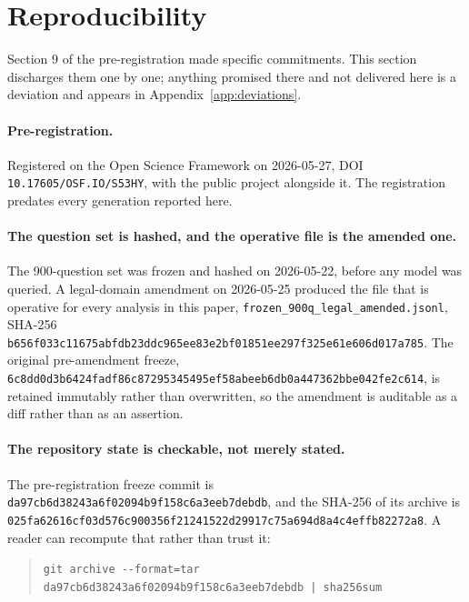 
\section{Reproducibility}

Section 9 of the pre-registration made specific commitments. This section
discharges them one by one; anything promised there and not delivered here is a
deviation and appears in Appendix~\ref{app:deviations}.

\paragraph{Pre-registration.}
Registered on the Open Science Framework on 2026-05-27, DOI
\texttt{10.17605/OSF.IO/S53HY}, with the public project alongside it. The
registration predates every generation reported here.

\paragraph{The question set is hashed, and the operative file is the amended one.}
The 900-question set was frozen and hashed on 2026-05-22, before any model was
queried. A legal-domain amendment on 2026-05-25 produced the file that is
operative for every analysis in this paper,
\texttt{frozen\_900q\_legal\_amended.jsonl}, SHA-256
\texttt{b656f033c11675abfdb23ddc965ee83e2bf01851ee297f325e61e606d017a785}. The
original pre-amendment freeze,
\texttt{6c8dd0d3b6424fadf86c87295345495ef58abeeb6db0a447362bbe042fe2c614}, is
retained immutably rather than overwritten, so the amendment is auditable as a
diff rather than as an assertion.

\paragraph{The repository state is checkable, not merely stated.}
The pre-registration freeze commit is
\texttt{da97cb6d38243a6f02094b9f158c6a3eeb7debdb}, and the SHA-256 of its archive
is
\texttt{025fa62616cf03d576c900356f21241522d29917c75a694d8a4c4effb82272a8}.
A reader can recompute that rather than trust it:

\begin{quote}
\texttt{git archive -{}-format=tar da97cb6d38243a6f02094b9f158c6a3eeb7debdb | sha256sum}
\end{quote}

